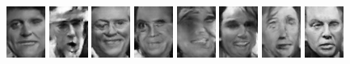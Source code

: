 \begin{figure}[!h]
    \centerline{
        \includegraphics[scale=1]{figures/lfw/appendix2/lfw64x48bw_image0008.png}
        \includegraphics[scale=1]{figures/lfw/appendix2/lfw64x48bw_image0009.png}
        \includegraphics[scale=1]{figures/lfw/appendix2/lfw64x48bw_image0010.png}
        \includegraphics[scale=1]{figures/lfw/appendix2/lfw64x48bw_image0011.png}
        \includegraphics[scale=1]{figures/lfw/appendix2/lfw64x48bw_image0012.png}
        \includegraphics[scale=1]{figures/lfw/appendix2/lfw64x48bw_image0013.png}
        \includegraphics[scale=1]{figures/lfw/appendix2/lfw64x48bw_image0014.png}
        \includegraphics[scale=1]{figures/lfw/appendix2/lfw64x48bw_image0015.png}
    }
    \vspace{0.1cm}

\end{figure}
